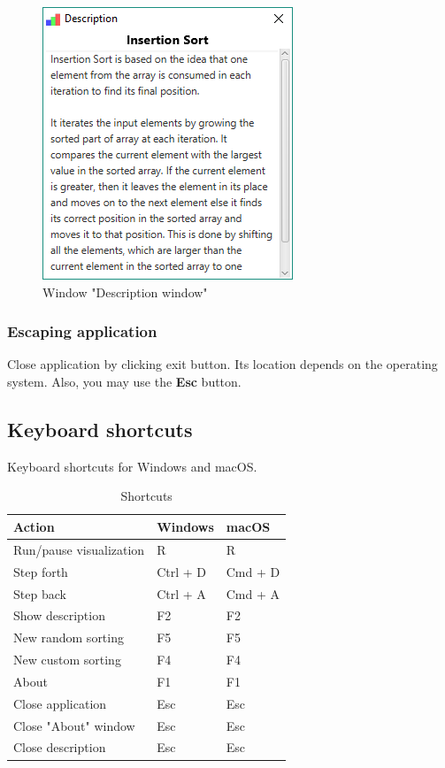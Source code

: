 \documentclass[
  field=inf,
  biblatex,
  language=english,
  glossaries,
  theorems=false,
  sourcecodes=false,
  index
]{kidiplom}
\begin{document}
\begin{figure}[H]
\begin{center}
	\includegraphics[scale=0.7]{img/ui/WindowDescription.png}
	\caption{Window "Description window"}\label{fig:desc}
\end{center}
\end{figure}

\subsubsection{Escaping application}

Close application by clicking exit button. Its location depends on the operating system. Also, you may use the \textbf{Esc} button.

\subsection{Keyboard shortcuts}

Keyboard shortcuts for Windows and macOS.

\begin{table}[H]
	\centering
	\caption{Shortcuts}\label{tab:keyboard}
	\begin{tabular}{||l|l|l||}
	\hline
	\textbf{Action} & \textbf{Windows} & \textbf{macOS}\\
	\hline
	Run/pause visualization & R & R\\
	\hline
	Step forth & Ctrl + D & Cmd + D\\
	\hline
	Step back & Ctrl + A & Cmd + A\\
	\hline
	Show description & F2 & F2\\
	\hline
	New random sorting & F5 & F5\\
	\hline
	New custom sorting & F4 & F4\\
	\hline
	About & F1 & F1\\
	\hline
	Close application & Esc & Esc\\
	\hline
	Close "About" window & Esc & Esc\\
	\hline
	Close description & Esc & Esc\\
	\hline
	
	\end{tabular}
\end{table}
\end{document}
